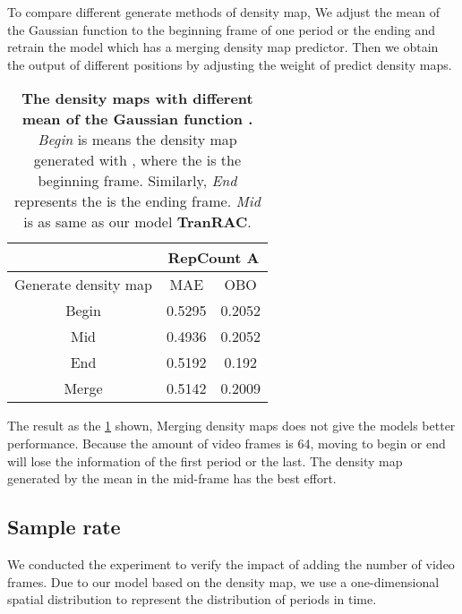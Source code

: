 \documentclass[10pt,twocolumn,letterpaper]{article}
\begin{document}
To compare different generate methods of density map, We adjust the mean  of the Gaussian function to the beginning frame of one period or the ending and retrain the model which has a merging density map predictor. Then we obtain the output of different positions by adjusting the weight of predict density maps.
\begin{table}[ht]

	\centering
	\begin{tabular}{c|cc}
		\hline
		                     & \multicolumn{2}{c}{RepCount A}                        \\ \hline
		Generate density map & \multicolumn{1}{c|}{MAE} & OBO  \\ \hline
		Begin                & \multicolumn{1}{c|}{0.5295}          & 0.2052         \\
		Mid                  & \multicolumn{1}{c|}{0.4936}          & 0.2052         \\
		End                  & \multicolumn{1}{c|}{0.5192}          & 0.192          \\
		Merge                & \multicolumn{1}{c|}{0.5142}          & 0.2009         \\ \hline
	\end{tabular}

	\caption{
		\textbf{The density maps with different mean  of the Gaussian function .} \emph{Begin} is means the density map generated with , where the  is the beginning frame. Similarly, \emph{End} represents the  is the ending frame. \emph{Mid} is as same as our model \textbf{TranRAC}.
	}
	\label{tab:multi density maps}
\end{table}

The result as the \cref{tab:multi density maps} shown, Merging density maps does not give the models better performance. Because the amount of video frames is 64, moving  to begin or end will lose the information of the first period or the last. The density map generated by the mean in the mid-frame has the best effort.

\subsection{Sample rate}

We conducted the experiment to verify the impact of adding the number of video frames. Due to our model based on the density map, we use a one-dimensional spatial distribution to represent the distribution of periods in time. 
\end{document}
